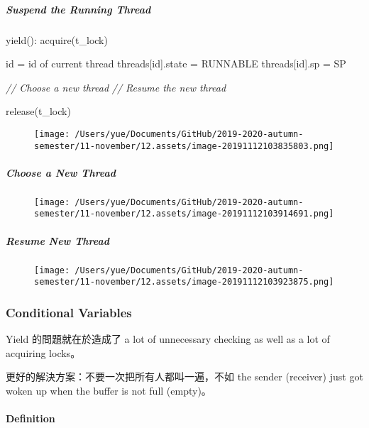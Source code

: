 \documentclass[
]{article}
\newenvironment{Shaded}{}{}
\newcommand{\CommentTok}[1]{\textcolor[rgb]{0.38,0.63,0.69}{\textit{#1}}}
\newcommand{\NormalTok}[1]{#1}
\begin{document}
\hypertarget{header-n207}{%
\subparagraph{Suspend the Running Thread}\label{header-n207}}

\begin{Shaded}
\begin{Highlighting}[]
\NormalTok{yield():}
\NormalTok{  acquire(t_lock)}

\NormalTok{  id = id of current thread}
\NormalTok{  threads[id].state = RUNNABLE}
\NormalTok{  threads[id].sp = SP}

  \CommentTok{// Choose a new thread}
  \CommentTok{// Resume the new thread}
  
\NormalTok{  release(t_lock)}
\end{Highlighting}
\end{Shaded}

\begin{figure}
\centering
\texttt{[image: /Users/yue/Documents/GitHub/2019-2020-autumn-semester/11-november/12.assets/image-20191112103835803.png]}
\caption{}
\end{figure}

\hypertarget{header-n210}{%
\subparagraph{Choose a New Thread}\label{header-n210}}

\begin{figure}
\centering
\texttt{[image: /Users/yue/Documents/GitHub/2019-2020-autumn-semester/11-november/12.assets/image-20191112103914691.png]}
\caption{}
\end{figure}

\hypertarget{header-n212}{%
\subparagraph{Resume New Thread}\label{header-n212}}

\begin{figure}
\centering
\texttt{[image: /Users/yue/Documents/GitHub/2019-2020-autumn-semester/11-november/12.assets/image-20191112103923875.png]}
\caption{}
\end{figure}

\hypertarget{header-n214}{%
\subsubsection{Conditional Variables}\label{header-n214}}

Yield 的問題就在於造成了 a lot of unnecessary checking as well as a lot
of acquiring locks。

更好的解決方案：不要一次把所有人都叫一遍，不如 the sender (receiver)
just got woken up when the buffer is not full (empty)。

\hypertarget{header-n217}{%
\paragraph{Definition}\label{header-n217}}
\end{document}
